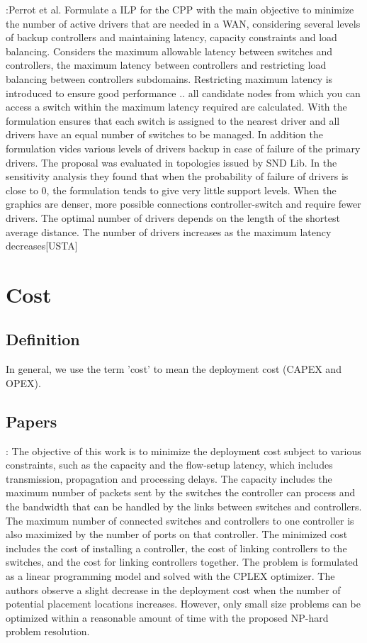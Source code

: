 \documentclass[a4paper,10pt]{article}
\begin{document}
\cite{PeRe16}:Perrot et al. Formulate a ILP for the CPP with the main objective to minimize the number of active drivers that are needed in a WAN, considering several levels of backup controllers and maintaining latency, capacity constraints and load balancing. Considers the maximum allowable latency between switches and controllers, the maximum latency between controllers and restricting load balancing between controllers subdomains. Restricting maximum latency is introduced to ensure good performance .. all candidate nodes from which you can access a switch within the maximum latency required are calculated. With the formulation ensures that each switch is assigned to the nearest driver and all drivers have an equal number of switches to be managed. In addition the formulation vides various levels of drivers backup in case of failure of the primary drivers.
The proposal was evaluated in topologies issued by SND Lib. In the sensitivity analysis they found that when the probability of failure of drivers is close to 0, the formulation tends to give very little support levels. When the graphics are denser, more possible connections controller-switch and require fewer drivers. The optimal number of drivers depends on the length of the shortest average distance. The number of drivers increases as the maximum latency decreases[USTA]



\section{Cost}
\subsection{Definition}
In general, we use the term 'cost' to mean the deployment cost (CAPEX and OPEX). 



\subsection{Papers}
\cite{SaSt15}: The objective of this work is to minimize the deployment cost subject to various constraints, such as the capacity and the flow-setup latency, which includes transmission, propagation and processing delays. The capacity includes the maximum number of packets sent by the switches the controller can process and the bandwidth that can be handled by the links between switches and controllers. The maximum number of connected switches and controllers to one controller is also maximized by the number of ports on that controller. The minimized cost includes the cost of installing a controller, the cost of linking controllers to the switches, and the cost for linking controllers together. The problem is formulated as a linear programming model and solved with the CPLEX optimizer. The authors observe a slight decrease in the deployment cost when the number of potential placement locations increases. However, only small size problems can be optimized within a reasonable amount of time with the proposed NP-hard problem resolution. 
\end{document}
